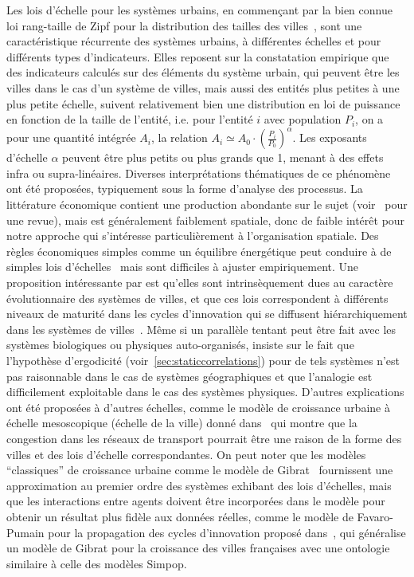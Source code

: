 {}{
Les lois d'échelle pour les systèmes urbains, en commençant par la bien connue loi rang-taille de Zipf pour la distribution des tailles des villes~\cite{gabaix1999zipf}, sont une caractéristique récurrente des systèmes urbains, à différentes échelles et pour différents types d'indicateurs. Elles reposent sur la constatation empirique que des indicateurs calculés sur des éléments du système urbain, qui peuvent être les villes dans le cas d'un système de villes, mais aussi des entités plus petites à une plus petite échelle, suivent relativement bien une distribution en loi de puissance en fonction de la taille de l'entité, i.e. pour l'entité $i$ avec population $P_i$, on a pour une quantité intégrée $A_i$, la relation $A_i \simeq A_0\cdot \left(\frac{P_i}{P_0}\right)^{\alpha}$. Les exposants d'échelle $\alpha$ peuvent être plus petits ou plus grands que 1, menant à des effets infra ou supra-linéaires. Diverses interprétations thématiques de ce phénomène ont été proposées, typiquement sous la forme d'analyse des processus. La littérature économique contient une production abondante sur le sujet (voir~\cite{Gabaix20042341} pour une revue), mais est généralement faiblement spatiale, donc de faible intérêt pour notre approche qui s'intéresse particulièrement à l'organisation spatiale. Des règles économiques simples comme un équilibre énergétique peut conduire à de simples lois d'échelles~\cite{bettencourt2008large} mais sont difficiles à ajuster empiriquement. Une proposition intéressante par  est qu'elles sont intrinsèquement dues au caractère évolutionnaire des systèmes de villes, et que ces lois correspondent à différents niveaux de maturité dans les cycles d'innovation qui se diffusent hiérarchiquement dans les systèmes de villes~\cite{pumain2006evolutionary}. Même si un parallèle tentant peut être fait avec les systèmes biologiques ou physiques auto-organisés, \cite{pumain2012urban} insiste sur le fait que l'hypothèse d'ergodicité (voir~\ref{sec:staticcorrelations}) pour de tels systèmes n'est pas raisonnable dans le cas de systèmes géographiques et que l'analogie est difficilement exploitable dans le cas des systèmes physiques. D'autres explications ont été proposées à d'autres échelles, comme le modèle de croissance urbaine à échelle mesoscopique (échelle de la ville) donné dans~\cite{louf2014congestion} qui montre que la congestion dans les réseaux de transport pourrait être une raison de la forme des villes et des lois d'échelle correspondantes. On peut noter que les modèles ``classiques'' de croissance urbaine comme le modèle de Gibrat~\cite{favaro2011gibrat} fournissent une approximation au premier ordre des systèmes %
 exhibant des lois d'échelles, mais que les interactions entre agents doivent être incorporées dans le modèle pour obtenir un résultat plus fidèle aux données réelles, comme le modèle de Favaro-Pumain pour la propagation des cycles d'innovation proposé dans~\cite{favaro2011gibrat}, qui généralise un modèle de Gibrat pour la croissance des villes françaises avec une ontologie similaire à celle des modèles Simpop.
}
